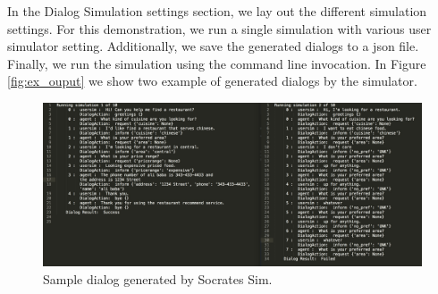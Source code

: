 In the Dialog Simulation settings section, we lay out the different simulation settings. For this demonstration, we run a single simulation with various user simulator setting. Additionally, we save the generated dialogs to a json file. Finally, we run the simulation using the command line invocation. In Figure \ref{fig:ex_ouput} we show two example of generated dialogs by the simulator. 
\begin{figure}[h!]
	\centering
	\includegraphics[scale=.16]{diagrams/sample_res_output.jpeg}
	\caption{ Sample dialog generated by Socrates Sim.}
	\label{fig:ex_ouput }
\end{figure}



